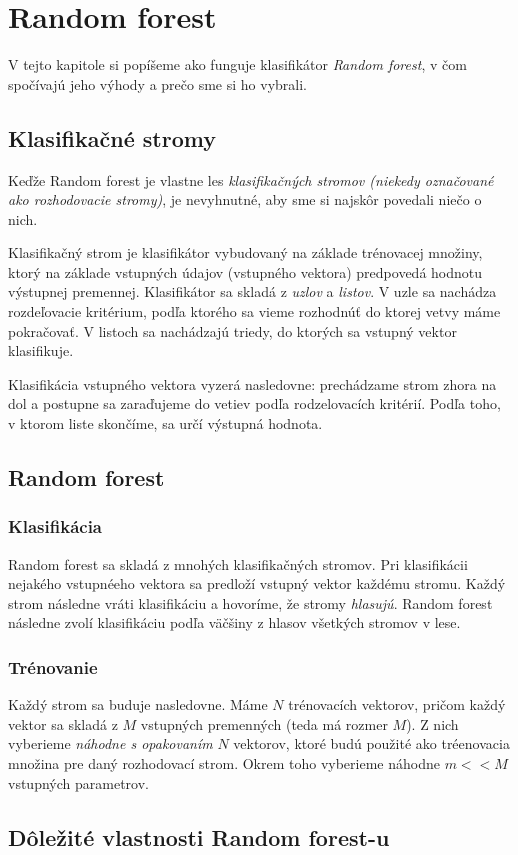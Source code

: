\chapter{Random forest}

V tejto kapitole si popíšeme ako funguje klasifikátor \textit{Random forest}, v čom spočívajú jeho výhody a prečo sme si ho vybrali.

\section{Klasifikačné stromy}
Keďže Random forest je vlastne les \textit{klasifikačných stromov (niekedy označované ako rozhodovacie stromy)}, je nevyhnutné, aby sme si najskôr povedali niečo o nich.

Klasifikačný strom je klasifikátor vybudovaný na základe trénovacej množiny, ktorý na základe vstupných údajov (vstupného vektora) predpovedá hodnotu výstupnej premennej. Klasifikátor sa skladá z \textit{uzlov} a \textit{listov}. V uzle sa nachádza rozdeľovacie kritérium, podľa ktorého sa vieme rozhodnúť do ktorej vetvy máme pokračovať. V listoch sa nachádzajú triedy, do ktorých sa vstupný vektor klasifikuje.

Klasifikácia vstupného vektora vyzerá nasledovne: prechádzame strom zhora na dol a postupne sa zaraďujeme do vetiev podľa rodzelovacích kritérií. Podľa toho, v ktorom liste skončíme, sa určí výstupná hodnota.

\section{Random forest}

\subsection{Klasifikácia}
Random forest sa skladá z mnohých klasifikačných stromov. Pri klasifikácii nejakého vstupnéeho vektora sa predloží vstupný vektor každému stromu. Každý strom následne vráti klasifikáciu a hovoríme, že stromy \textit{hlasujú}. Random forest následne zvolí klasifikáciu podľa väčšiny z hlasov všetkých stromov v lese.

\subsection{Trénovanie}
Každý strom sa buduje nasledovne.
Máme $N$ trénovacích vektorov, pričom každý vektor sa skladá z $M$ vstupných premenných (teda má rozmer $M$). 
Z nich vyberieme \textit{náhodne s opakovaním} $N$ vektorov, ktoré budú použité ako tréenovacia množina pre daný rozhodovací strom.
Okrem toho vyberieme náhodne $m<<M$ vstupných parametrov.

\section{Dôležité vlastnosti Random forest-u}




